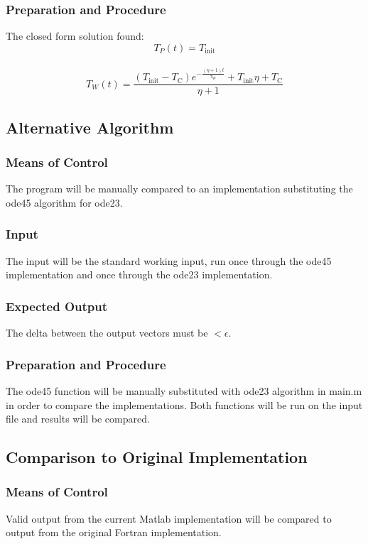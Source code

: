 \documentclass[12pt]{article}
\begin{document}
\subsubsection{Preparation and Procedure}
The closed form solution found:
$$ T_P(t) = T_{\text{init}}$$
\\
$$T_W(t) = \frac{(T_{\text{init}}-T_{\text{C}})e^{-\frac{(\eta+1)t}{\tau_{\text{W}}}}+T_{\text{init}}\eta+T_{\text{C}}}{\eta+1}
$$



\subsection{Alternative Algorithm}
\subsubsection{Means of Control}
The program will be manually compared to an implementation substituting the ode45
 algorithm for ode23. 

\subsubsection{Input}
The input will be the standard working input, run once through the ode45 implementation
 and once through the ode23 implementation. 

\subsubsection{Expected Output}
The delta between the output vectors must be 
$< \epsilon$.

\subsubsection{Preparation and Procedure}
The ode45 function will be manually substituted with ode23 algorithm in main.m in order to compare the implementations. Both functions will be run on the input file and results will be compared.

\subsection{Comparison to Original Implementation}
\subsubsection{Means of Control}
Valid output from the current Matlab implementation will be compared to output
 from the original Fortran implementation.
 
\end{document}
